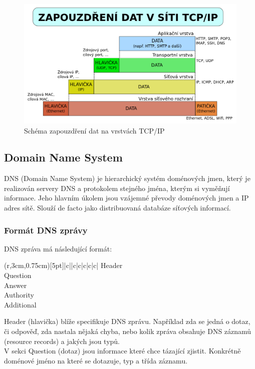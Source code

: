 \documentclass[11pt, a4paper, titlepage]{article}
\begin{document}
\begin{figure}[htp]
    \centering
    \includegraphics[width=.55\textwidth]{layers_schema.png}\hfill
    \caption{Schéma zapouzdření dat na vrstvách TCP/IP}
\end{figure}

\subsection{Domain Name System}

DNS (Domain Name System) je hierarchický systém doménových jmen, který je realizován servery DNS a protokolem stejného jména, kterým si vyměňují informace. Jeho hlavním úkolem jsou vzájemné převody doménových jmen a IP adres sítě. Slouží de facto jako distribuovaná databáze síťových informací.

\subsubsection{Formát DNS zprávy}

DNS zpráva má následující formát:

\begin{table}[H]
	\centering
	\begin{TAB}(r,3cm,0.75cm)[5pt]{|c|}{|c|c|c|c|c|}
		Header \\
		Question \\
		Answer \\
		Authority \\
		Additional \\
	\end{TAB}
\end{table}

Header (hlavička) blíže specifikuje DNS zprávu. Například zda se jedná o dotaz, či odpověď, zda nastala nějaká chyba, nebo kolik zpráva obsahuje DNS záznamů (resource records) a jakých jsou typů. \\

V sekci Question (dotaz) jsou informace které chce tázající zjistit. Konkrétně doménové jméno na které se dotazuje, typ a třída záznamu. \\
\end{document}
